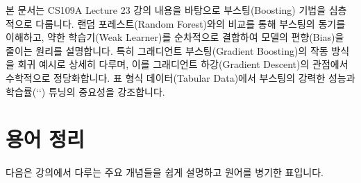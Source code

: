 \documentclass[11pt,a4paper]{article}
\begin{document}
\begin{summarybox}[title={개요: CS109A Lecture 23 - 부스팅과 그래디언트 부스팅}]
본 문서는 CS109A Lecture 23 강의 내용을 바탕으로 부스팅(Boosting) 기법을 심층적으로 다룹니다.
랜덤 포레스트(Random Forest)와의 비교를 통해 부스팅의 동기를 이해하고,
약한 학습기(Weak Learner)를 순차적으로 결합하여 모델의 편향(Bias)을 줄이는 원리를 설명합니다.
특히 그래디언트 부스팅(Gradient Boosting)의 작동 방식을 회귀 예시로 상세히 다루며,
이를 그래디언트 하강(Gradient Descent)의 관점에서 수학적으로 정당화합니다.
표 형식 데이터(Tabular Data)에서 부스팅의 강력한 성능과 학습률(`\lambda`) 튜닝의 중요성을 강조합니다.
\end{summarybox}

\newpage
\section*{용어 정리}
다음은 강의에서 다루는 주요 개념들을 쉽게 설명하고 원어를 병기한 표입니다.
\end{document}
